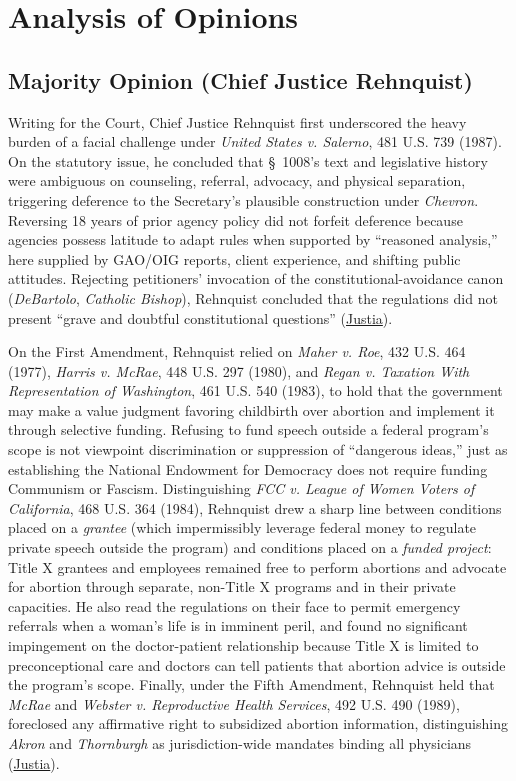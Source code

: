 \documentclass[12pt]{article}
\begin{document}
\section{Analysis of Opinions}

\subsection{Majority Opinion (Chief Justice Rehnquist)}

Writing for the Court, Chief Justice Rehnquist first underscored the heavy burden of a facial challenge under \textit{United States v. Salerno}, 481 U.S. 739 (1987). On the statutory issue, he concluded that \S~1008's text and legislative history were ambiguous on counseling, referral, advocacy, and physical separation, triggering deference to the Secretary's plausible construction under \textit{Chevron}. Reversing 18 years of prior agency policy did not forfeit deference because agencies possess latitude to adapt rules when supported by ``reasoned analysis,'' here supplied by GAO/OIG reports, client experience, and shifting public attitudes. Rejecting petitioners' invocation of the constitutional-avoidance canon (\textit{DeBartolo}, \textit{Catholic Bishop}), Rehnquist concluded that the regulations did not present ``grave and doubtful constitutional questions'' (\href{https://supreme.justia.com/cases/federal/us/500/173/}{Justia}).

On the First Amendment, Rehnquist relied on \textit{Maher v. Roe}, 432 U.S. 464 (1977), \textit{Harris v. McRae}, 448 U.S. 297 (1980), and \textit{Regan v. Taxation With Representation of Washington}, 461 U.S. 540 (1983), to hold that the government may make a value judgment favoring childbirth over abortion and implement it through selective funding. Refusing to fund speech outside a federal program's scope is not viewpoint discrimination or suppression of ``dangerous ideas,'' just as establishing the National Endowment for Democracy does not require funding Communism or Fascism. Distinguishing \textit{FCC v. League of Women Voters of California}, 468 U.S. 364 (1984), Rehnquist drew a sharp line between conditions placed on a \textit{grantee} (which impermissibly leverage federal money to regulate private speech outside the program) and conditions placed on a \textit{funded project}: Title X grantees and employees remained free to perform abortions and advocate for abortion through separate, non-Title X programs and in their private capacities. He also read the regulations on their face to permit emergency referrals when a woman's life is in imminent peril, and found no significant impingement on the doctor-patient relationship because Title X is limited to preconceptional care and doctors can tell patients that abortion advice is outside the program's scope. Finally, under the Fifth Amendment, Rehnquist held that \textit{McRae} and \textit{Webster v. Reproductive Health Services}, 492 U.S. 490 (1989), foreclosed any affirmative right to subsidized abortion information, distinguishing \textit{Akron} and \textit{Thornburgh} as jurisdiction-wide mandates binding all physicians (\href{https://supreme.justia.com/cases/federal/us/500/173/}{Justia}).
\end{document}
